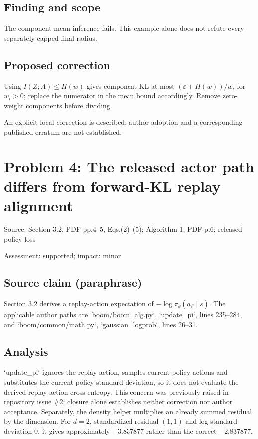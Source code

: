 \documentclass[11pt]{article}
\begin{document}
\subsection*{Finding and scope}

The component-mean inference fails. This example alone does not refute every separately capped final radius.

\subsection*{Proposed correction}

Using \(I(Z;A)\leq H(w)\) gives component KL at most \((\varepsilon+H(w))/w_i\) for \(w_i>0\); replace the numerator in the mean bound accordingly. Remove zero-weight components before dividing.

An explicit local correction is described; author adoption and a corresponding published erratum are not established.

\section*{Problem 4: The released actor path differs from forward-KL replay alignment}

Source: Section 3.2, PDF pp.4–5, Eqs.(2)–(5); Algorithm 1, PDF p.6; released policy loss

Assessment: supported; impact: minor

\subsection*{Source claim (paraphrase)}

Section 3.2 derives a replay-action expectation of \(-\log\pi_\theta(a_\beta\mid s)\). The applicable author paths are `boom/boom\_alg.py`, `update\_pi`, lines 235–284, and `boom/common/math.py`, `gaussian\_logprob`, lines 26–31.

\subsection*{Analysis}

`update\_pi` ignores the replay action, samples current-policy actions and substitutes the current-policy standard deviation, so it does not evaluate the derived replay-action cross-entropy. This concern was previously raised in repository issue \#2; closure alone establishes neither correction nor author acceptance. Separately, the density helper multiplies an already summed residual by the dimension. For \(d=2\), standardized residual \((1,1)\) and log standard deviation \(0\), it gives approximately \(-3.837877\) rather than the correct \(-2.837877\).
\end{document}
